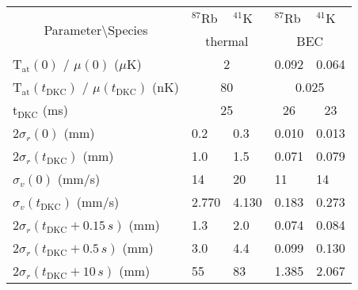 %
%
%
\begin{tabular}{@{}l|ll|ll@{}}
\toprule
\multicolumn{1}{c|}{\multirow{2}{*}{Parameter\textbackslash{}Species}} & $^{87}$Rb     & $^{41}$K     & $^{87}$Rb              & $^{41}$K               \\
\multicolumn{1}{c|}{}                                                  & \multicolumn{2}{c|}{thermal} & \multicolumn{2}{c}{BEC}                         \\ \midrule
T$_\text{at}(0)$ / $\mu(0)$ ($\mu$K)                                   & \multicolumn{2}{c|}{2}       & 0.092                  & 0.064                  \\
T$_\text{at}(t_\text{DKC})$ / $\mu(t_\text{DKC})$ (nK)                 & \multicolumn{2}{c|}{80}      & \multicolumn{2}{c}{0.025}                       \\
t$_\text{DKC}$ (ms)                                                    & \multicolumn{2}{c|}{25}      & \multicolumn{1}{c}{26} & \multicolumn{1}{c}{23} \\ \midrule
2$\sigma_r(0)$ (mm)                                                    & 0.2           & 0.3          & 0.010                  & 0.013                  \\
2$\sigma_r(t_\text{DKC})$ (mm)                                         & 1.0           & 1.5          & 0.071                  & 0.079                  \\
$\sigma_v(0)$ (mm/s)                                                   & 14            & 20           & 11                     & 14                     \\
$\sigma_v(t_\text{DKC})$ (mm/s)                                        & 2.770         & 4.130        & 0.183                  & 0.273                  \\
2$\sigma_r(t_\text{DKC}+0.15\,s)$ (mm)                                 & 1.3           & 2.0          & 0.074                  & 0.084                  \\
2$\sigma_r(t_\text{DKC}+0.5\,s)$ (mm)                                  & 3.0           & 4.4          & 0.099                  & 0.130                  \\
2$\sigma_r(t_\text{DKC}+10\,s)$ (mm)                                   & 55            & 83           & 1.385                  & 2.067                  \\ \bottomrule
\end{tabular}
%
%
